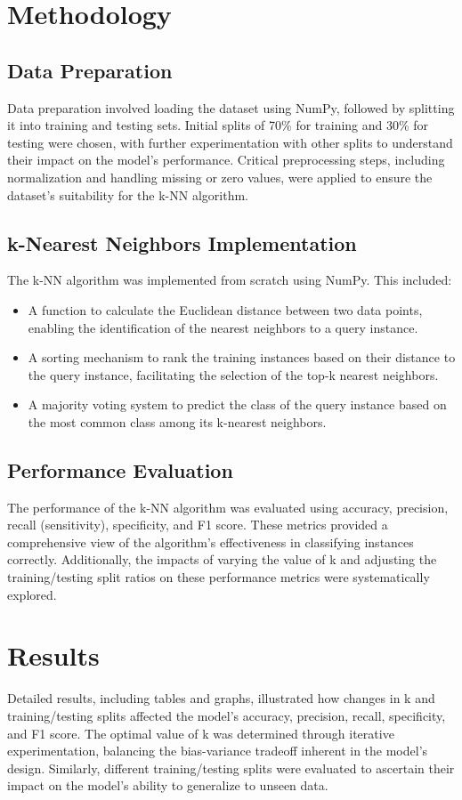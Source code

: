 \documentclass[11pt, a4paper]{article}
\begin{document}
\section{Methodology}
\subsection{Data Preparation}
Data preparation involved loading the dataset using NumPy, followed by splitting it into training and testing sets. Initial splits of 70\% for training and 30\% for testing were chosen, with further experimentation with other splits to understand their impact on the model's performance. Critical preprocessing steps, including normalization and handling missing or zero values, were applied to ensure the dataset's suitability for the k-NN algorithm.

\subsection{k-Nearest Neighbors Implementation}
The k-NN algorithm was implemented from scratch using NumPy. This included:
\begin{itemize}
    \item A function to calculate the Euclidean distance between two data points, enabling the identification of the nearest neighbors to a query instance.
    \item A sorting mechanism to rank the training instances based on their distance to the query instance, facilitating the selection of the top-k nearest neighbors.
    \item A majority voting system to predict the class of the query instance based on the most common class among its k-nearest neighbors.
\end{itemize}

\subsection{Performance Evaluation}
The performance of the k-NN algorithm was evaluated using accuracy, precision, recall (sensitivity), specificity, and F1 score. These metrics provided a comprehensive view of the algorithm's effectiveness in classifying instances correctly. Additionally, the impacts of varying the value of k and adjusting the training/testing split ratios on these performance metrics were systematically explored.

\section{Results}
Detailed results, including tables and graphs, illustrated how changes in k and training/testing splits affected the model's accuracy, precision, recall, specificity, and F1 score. The optimal value of k was determined through iterative experimentation, balancing the bias-variance tradeoff inherent in the model's design. Similarly, different training/testing splits were evaluated to ascertain their impact on the model's ability to generalize to unseen data.
\end{document}
